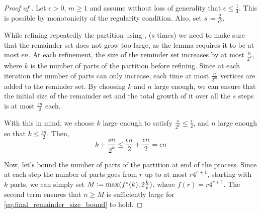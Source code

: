         \begin{proof}[Proof of ]
            Let $\epsilon > 0$, $m \geq 1$ and assume without loss of generality that $\epsilon \leq \frac{1}{4}$.
            This is possible by monotonicity of the regularity condition.
            Also, set $s \coloneqq \frac{2}{\epsilon^5}$.

            While refining repeatedly the partition using ,
            ($s$ times) we need to make sure that the remainder set does not grow too large, as the lemma requires it to
            be at most $\epsilon n$.
            At each refinement, the size of the reminder set increases by at most $\frac{n}{2^k}$, where $k$ is the
            number of parts of the partition before refining.
            Since at each iteration the number of parts can only increase, each time at most $\frac{n}{2^m}$ vertices
            are added to the reminder set.
            By choosing $k$ and $n$ large enough, we can ensure that the initial size of the remainder set and the
            total growth of it over all the $s$ steps is at most $\frac{\epsilon n}{2}$ each.

            With this in mind, we choose $k$ large enough to satisfy $\frac{s}{2^k} \leq \frac{\epsilon}{2}$, and
            $n$ large enough so that $k \leq \frac{\epsilon n}{2}$.
            Then,
            \begin{equation} \label{eq:final_remainder_size_bound}
                k + \frac{s n}{2^k} \leq \frac{\epsilon n}{2} + \frac{\epsilon n}{2} = \epsilon n
            \end{equation}

            Now, let's bound the number of parts of the partition at end of the process.
            Since at each step the number of parts goes from $r$ up to at most $r 4^{r+1}$, starting with $k$ parts,
            we can simply set $M \coloneqq \max( f^s(k), 2\frac{k}{\epsilon} )$, where $f(r) = r 4^{r+1}$.
            The second term ensures that $n \geq M$ is sufficiently large for \eqref{eq:final_remainder_size_bound} to hold.


\end{proof}
